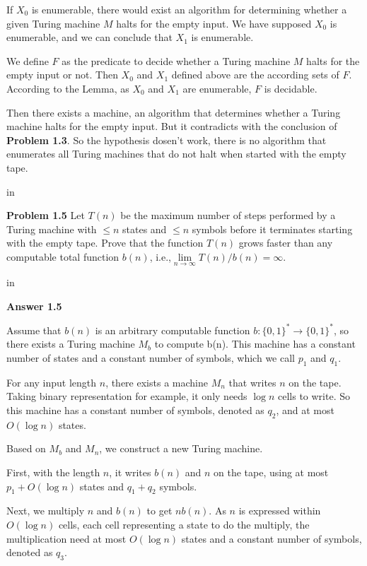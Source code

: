 \documentclass[11pt]{article}
\begin{document}
If $X_0$ is enumerable, there would exist an algorithm for determining whether a given Turing machine $M$ halts for the empty input. We have supposed $X_0$ is enumerable, and we can conclude that $X_1$ is enumerable.

We define $F$ as the predicate to decide whether a Turing machine $M$ halts for
the empty input or not. Then $X_0$ and $X_1$ defined above are the according sets of $F$.
According to the Lemma, as $X_0$ and $X_1$ are enumerable, $F$ is decidable.

Then there
exists a machine, an algorithm that determines whether a Turing machine halts for the
empty input. But it contradicts with the conclusion of {\bf Problem 1.3}. So the hypothesis
dosen’t work, there is no algorithm that enumerates all Turing machines that do not halt
when started with the empty tape.

 in

\newpage
{\bf Problem 1.5} Let $T(n)$ be the maximum number of steps performed by a Turing machine with $\leq n$ states and $\leq n$ symbols before it terminates starting with the empty tape. Prove that the function $T(n)$ grows faster than any computable total function $b(n)$, i.e.,$\lim\limits_{n\to\infty}T(n)/b(n)=\infty$.

 in


{\bf Answer 1.5 } 

Assume that $b(n)$ is an arbitrary computable function $b:\{0,1\}^{\ast}\to\{0,1\}^{\ast}$, so there exists a Turing machine $M_b$ to compute b(n). 
This machine has a constant number of states and a constant number of symbols, which we call $p_1$ and $q_1$. 

For any input length $n$, there exists a machine $M_n$ that writes $n$ on the tape. Taking binary representation for example, it only needs $\log n$ cells to write. So this machine has a constant number of symbols, denoted as $q_2$, and at most $O(\log n)$ states. 

Based on $M_b$ and $M_n$, we construct a new Turing machine. 

First, with the length $n$, it writes $b(n)$ and $n$ on the tape, using at most $p_1 + O(\log n)$ states and $q_1 +q_2$ symbols. 

Next, we multiply $n$ and $b(n)$ to get $nb(n)$. As $n$ is expressed within $O(\log n)$ cells, each cell representing a state to do the multiply, the multiplication need at most $O(\log n)$ states and a constant number of symbols, denoted as $q_3$. 
\end{document}
